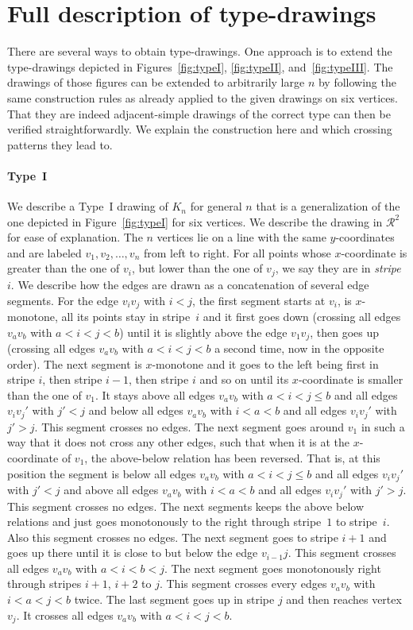 \documentclass[a4paper,UKenglish,cleveref, autoref, thm-restate]{lipics_arxiv}
\begin{document}
\section{Full description of type-drawings}\label{app:type-drawings}

   There are several ways to obtain type-drawings. One approach is to extend the type-drawings depicted in Figures~\ref{fig:typeI}, \ref{fig:typeII}, and~\ref{fig:typeIII}. The drawings of those figures can be extended to arbitrarily large $n$ by following the same construction rules as already applied to the given drawings on six vertices. That they are indeed adjacent-simple drawings of the correct type can then be verified straightforwardly. We explain the construction here and which crossing patterns they lead to.

   \paragraph*{Type~I}
   We describe a Type~I drawing of $K_n$ for general $n$ that is a generalization of the one depicted in Figure~\ref{fig:typeI} for six vertices. We describe the drawing in $\mathcal{R}^2$ for ease of explanation.
   The $n$ vertices lie on a line with the same $y$-coordinates and are labeled $v_1,v_2,\ldots,v_n$ from left to right. For all points whose $x$-coordinate is greater than the one of $v_i$, but lower than the one of $v_j$, we say they are in \textit{stripe}~$i$. We describe how the edges are drawn as a concatenation of several edge segments. For the edge $v_iv_j$ with $i<j$, the first segment starts at $v_i$, is $x$-monotone, all its points stay in stripe~$i$ and it first goes down (crossing all edges $v_av_b$ with $a<i<j<b$) until it is slightly above the edge $v_1v_j$, then goes up (crossing all edges $v_av_b$ with $a<i<j<b$ a second time, now in the opposite order). The next segment is $x$-monotone and it goes to the left being first in stripe $i$, then stripe $i-1$, then stripe $i$ and so on until its $x$-coordinate is smaller than the one of $v_1$. It stays above all edges $v_av_b$ with $a<i<j\leq b$ and all edges $v_iv_j'$ with $j'<j$ and below all edges $v_av_b$ with $i<a<b$ and all edges $v_iv_j'$ with $j'>j$. This segment crosses no edges. The next segment goes around $v_1$ in such a way that it does not cross any other edges, such that when it is at the $x$-coordinate of $v_1$, the above-below relation has been reversed. That is, at this position the segment is below all edges $v_av_b$ with $a<i<j\leq b$ and all edges $v_iv_j'$ with $j'<j$ and above all edges $v_av_b$ with $i<a<b$ and all edges $v_iv_j'$ with $j'>j$. This segment crosses no edges. The next segments keeps the above below relations and just goes monotonously to the right through stripe~$1$ to stripe~$i$. Also this segment crosses no edges. The next segment goes to stripe $i+1$ and goes up there until it is close to but below the edge $v_{i-1}j$. This segment crosses all edges $v_av_b$ with $a<i<b<j$. The next segment goes monotonously right through stripes $i+1$, $i+2$ to $j$. This segment crosses every edges $v_av_b$ with $i<a<j<b$ twice. The last segment goes up in stripe $j$ and then reaches vertex $v_j$. It crosses all edges $v_av_b$ with $a<i<j<b$.
\end{document}
